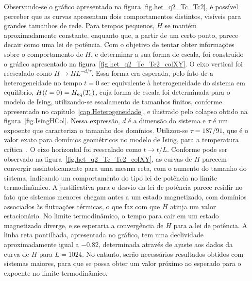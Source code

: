Observando-se o gráfico apresentado na figura \ref{fig.het_q2_Tc_Tc2}, é possível perceber que as curvas apresentam dois comportamentos distintos, visíveis para grandes tamanhos de rede. Para tempos pequenos, $H$ se mantém aproximadamente constante, enquanto que, a partir de um certo ponto, parece decair como uma lei de potência. Com o objetivo de tentar obter informações sobre o comportamento de $H$, e determinar a sua forma de escala, foi construído o gráfico apresentado na figura~\ref{fig.het_q2_Tc_Tc2_colXY}. O eixo vertical foi reescalado como $H \rightarrow HL^{-d/\tau}$. Essa forma era esperada, pelo fato de a heterogeneidade no tempo $t=0$ ser equivalente à heterogeneidade do sistema em equilíbrio, $H(t=0)=H_{\scriptstyle\rm eq}(T_c)$, cuja forma de escala foi determinada para o modelo de Ising, utilizando-se escalamento de tamanhos finitos, conforme apresentado no capítulo~\ref{cap.Heterogeneidade}, e ilustrado pelo colapso obtido na figura~\ref{fig.IsingHCol}. Nessa expressão, $d$ é a dimensão do sistema e $\tau$ é um expoente que caracteriza o tamanho dos domínios. Utilizou-se $\tau = 187/91$, que é o valor exato para domínios geométricos no modelo de Ising, para a temperatura crítica~\cite{PRLJeferson,PREJeferson}. O eixo horizontal foi reescalado como $t \rightarrow t/L$. Conforme pode ser observado na figura~\ref{fig.het_q2_Tc_Tc2_colXY}, as curvas de $H$ parecem convergir assintoticamente para uma mesma reta, com o aumento do tamanho do sistema, indicando um comportamento do tipo lei de potência no limite termodinâmico. A justificativa para o desvio da lei de potência parece residir no fato que sistemas menores chegam antes a um estado magnetizado, com domínios associados às flutuações térmicas, o que faz com que $H$ atinja um valor estacionário. No limite termodinâmico, o tempo para cair em um estado magnetizado diverge, e se esperaria a convergência de $H$ para a lei de potência. A linha reta pontilhada, apresentada no gráfico, tem uma declividade aproximadamente igual a $-0.82$, determinada através de ajuste aos dados da curva de $H$ para $L=1024$. No entanto, serão necessários resultados obtidos com sistemas maiores, para que se possa obter um valor próximo ao esperado para o expoente no limite termodinâmico.


